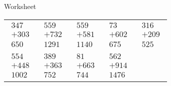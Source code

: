 \documentclass[15pt]{scrartcl}
\begin{document}
	\begin{center}
		\LARGE Worksheet
	\end{center}
	\begin{tabu} to \linewidth {XXXXX}
		$\begin{array}{r}
			347 \\
			+303 \\
			\hline
			650
			\end{array}$
		
		&
		$\begin{array}{r}
			559 \\
			+732 \\
			\hline
			1291
			\end{array}$
		
		&
		$\begin{array}{r}
			559 \\
			+581 \\
			\hline
			1140
			\end{array}$
		
		&
		$\begin{array}{r}
			73 \\
			+602 \\
			\hline
			675
			\end{array}$
		
		&
		$\begin{array}{r}
			316 \\
			+209 \\
			\hline
			525
			\end{array}$
		

		\\
		$\begin{array}{r}
			554 \\
			+448 \\
			\hline
			1002
			\end{array}$
		
		&
		$\begin{array}{r}
			389 \\
			+363 \\
			\hline
			752
			\end{array}$
		
		&
		$\begin{array}{r}
			81 \\
			+663 \\
			\hline
			744
			\end{array}$
		
		&
		$\begin{array}{r}
			562 \\
			+914 \\
			\hline
			1476
			\end{array}$
		

\end{tabu}
\end{document}
